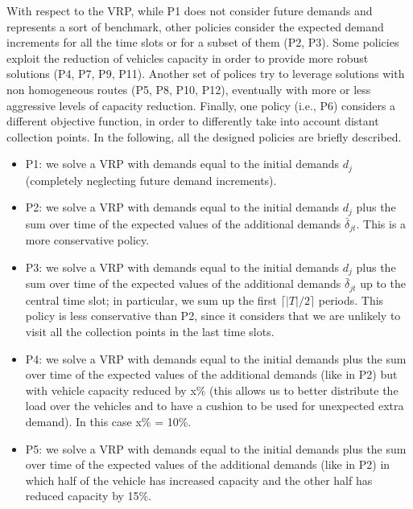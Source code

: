 \documentclass[authoryear,preprint,12pt]{elsarticle}
\begin{document}
With respect to the VRP, while P1 does not consider future demands and represents a sort of benchmark, other policies consider the expected demand increments for all the time slots or for a subset of them (P2, P3). Some policies exploit the reduction of vehicles capacity in order to provide more robust solutions (P4, P7, P9, P11). Another set of polices try to leverage solutions with non homogeneous routes (P5, P8, P10, P12), eventually with more or less aggressive levels of capacity reduction. Finally, one policy (i.e., P6) considers a different objective function, in order to differently take into account distant collection points. In the following, all the designed policies are briefly described.
\begin{itemize}
\item P1: we solve a VRP with demands equal to the initial demands $d_j$ (completely neglecting future demand increments).

\item P2: we solve a VRP with demands equal to the initial demands $d_j$ plus the  sum over time of the expected values of the additional demands $\bar\delta_{jt}$. This is a more conservative policy. 

\item P3: we solve a VRP with demands equal to the initial demands $d_j$ plus the sum over time of the expected values of the additional demands $\bar\delta_{jt}$ up to the central time slot; in particular, we sum up the first $\lceil |T| /2 \rceil$ periods. This policy is less conservative than P2, since it considers that we are unlikely to visit all the collection points in the last time slots.

\item P4: we solve a VRP with demands equal to the initial demands plus the sum over time of the expected values of the additional demands (like in P2) but with vehicle capacity reduced by x\% (this allows us to better distribute the load over the vehicles and to have a cushion to be used for unexpected extra demand). In this case x\% = 10\%. 

\item P5: we solve a VRP with demands equal to the initial demands plus the sum over time of the expected values of the additional demands (like in P2)
in which half of the vehicle has increased capacity and the other half has reduced capacity by 15\%. 


\end{itemize}
\end{document}
